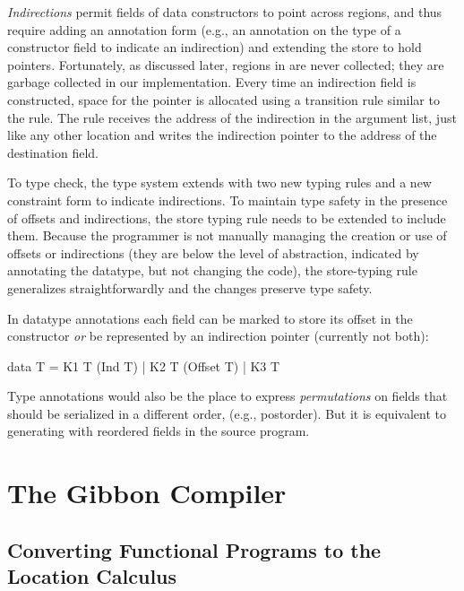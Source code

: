 \documentclass[showabstract,showacknowledgments,showpreface,showdedication]{iuphd}
\theoremstyle{nonumberplain}
\begin{document}
\emph{Indirections} permit fields of data constructors to point across
regions, and thus require adding an annotation form (e.g., an
annotation on the type of a constructor field to indicate an
indirection) and extending the store to hold pointers.
%
Fortunately, as discussed later, regions in \ourcalc{} are never
collected; they are garbage collected in our implementation.
%
Every time an indirection field is constructed, space for the pointer
is allocated using a transition rule similar to the \textsc{\dletloctag{}}
rule.
%
The \textsc{\ddatacon{}} rule receives the address of the indirection in the
argument list, just like any other location and writes the indirection
pointer to the address of the destination field.
%

To type check, the type system extends with two new typing rules and a
new constraint form to indicate indirections.
%
To maintain type safety in the presence of offsets and indirections,
the store typing rule needs to be extended to include them.
%
Because the programmer is not manually managing the creation or use of offsets
or indirections (they are below the level of abstraction, indicated by
annotating the datatype, but not changing the code), the store-typing rule
generalizes straightforwardly and the changes preserve type safety.

In datatype annotations each field can be marked to store its offset in the constructor {\em
  or} be represented by an indirection pointer (currently not both):
\begin{code}
data T = K1 T (Ind T) | K2 T (Offset T) | K3 T
\end{code}
Type annotations would also be the place to express {\em permutations} on fields
that should be serialized in a different order, (e.g., postorder).  But it is
equivalent to generating \ourcalc with reordered fields in the source program.


\chapter{The Gibbon Compiler}

\section{Converting Functional Programs to the Location Calculus}\label{sec:infer-local}
\end{document}
